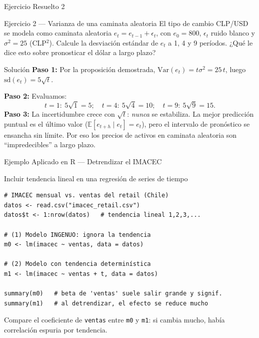 \documentclass{beamer}
\begin{document}
\begin{frame}{Ejercicio Resuelto 2}

\begin{block}{Ejercicio 2 --- Varianza de una caminata aleatoria}
El tipo de cambio CLP/USD se modela como caminata aleatoria $e_t = e_{t-1}+\epsilon_t$, con $e_0 = 800$, $\epsilon_t$ ruido blanco y $\sigma^2 = 25$ (CLP$^2$). Calcule la desviación estándar de $e_t$ a 1, 4 y 9 períodos. ¿Qué le dice esto sobre pronosticar el dólar a largo plazo?
\end{block}

\pause

\begin{exampleblock}{Solución}
\textbf{Paso 1:} Por la proposición demostrada, $\text{Var}(e_t)=t\sigma^2 = 25\,t$, luego $\text{sd}(e_t)=5\sqrt{t}$.

\textbf{Paso 2:} Evaluamos:
\[
t=1:\ 5\sqrt1 = 5; \quad t=4:\ 5\sqrt4 = 10; \quad t=9:\ 5\sqrt9 = 15.
\]
\textbf{Paso 3:} La incertidumbre crece con $\sqrt{t}$: \emph{nunca} se estabiliza. La mejor predicción puntual es el último valor ($\mathbb{E}[e_{t+h}\mid e_t]=e_t$), pero el intervalo de pronóstico se ensancha sin límite. Por eso los precios de activos en caminata aleatoria son ``impredecibles'' a largo plazo.
\end{exampleblock}

\end{frame}

\begin{frame}[fragile]{Ejemplo Aplicado en R --- Detrendizar el IMACEC}

\begin{exampleblock}{Incluir tendencia lineal en una regresión de series de tiempo}
\begin{verbatim}
# IMACEC mensual vs. ventas del retail (Chile)
datos <- read.csv("imacec_retail.csv")
datos$t <- 1:nrow(datos)   # tendencia lineal 1,2,3,...

# (1) Modelo INGENUO: ignora la tendencia
m0 <- lm(imacec ~ ventas, data = datos)

# (2) Modelo con tendencia determinística
m1 <- lm(imacec ~ ventas + t, data = datos)

summary(m0)   # beta de 'ventas' suele salir grande y signif.
summary(m1)   # al detrendizar, el efecto se reduce mucho
\end{verbatim}
\end{exampleblock}
{\small Compare el coeficiente de \texttt{ventas} entre \texttt{m0} y \texttt{m1}: si cambia mucho, había correlación espuria por tendencia.}

\end{frame}
\end{document}
